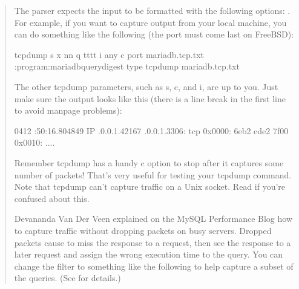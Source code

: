 \documentclass[letterpaper,10pt,english]{sphinxmanual}
\begin{document}
\begin{fulllineitems}
\begin{quote}
\sphinxAtStartPar
The parser expects the input to be formatted with the following options: .  For example, if you want to capture output from your local machine,
you can do something like the following (the port must come last on FreeBSD):

\begin{sphinxVerbatim}[commandchars=\\\{\}]
tcpdump \PYGZhy{}s  \PYGZhy{}x \PYGZhy{}nn \PYGZhy{}q \PYGZhy{}tttt \PYGZhy{}i any \PYGZhy{}c  port  
  \PYGZgt{} mariadb.tcp.txt
:program:mariadb\PYGZhy{}query\PYGZhy{}digest \PYGZhy{}\PYGZhy{}type tcpdump mariadb.tcp.txt
\end{sphinxVerbatim}

\sphinxAtStartPar
The other tcpdump parameters, such as \sphinxhyphen{}s, \sphinxhyphen{}c, and \sphinxhyphen{}i, are up to you.  Just make
sure the output looks like this (there is a line break in the first line to
avoid man\sphinxhyphen{}page problems):

\begin{sphinxVerbatim}[commandchars=\\\{\}]
\PYGZhy{}04\PYGZhy{}12 :50:16.804849 IP .0.0.1.42167
       \PYGZgt{} .0.0.1.3306: tcp 
    0x0000:    6eb2   cde2 7f00 
    0x0010:  ....
\end{sphinxVerbatim}

\sphinxAtStartPar
Remember tcpdump has a handy \sphinxhyphen{}c option to stop after it captures some number of
packets!  That’s very useful for testing your tcpdump command.  Note that
tcpdump can’t capture traffic on a Unix socket.  Read
 if you’re confused about this.

\sphinxAtStartPar
Devananda Van Der Veen explained on the MySQL Performance Blog how to capture
traffic without dropping packets on busy servers.  Dropped packets cause
 to miss the response to a request, then see the response to a
later request and assign the wrong execution time to the query.  You can change
the filter to something like the following to help capture a subset of the
queries.  (See  for details.)


\end{quote}
\end{fulllineitems}
\end{document}
